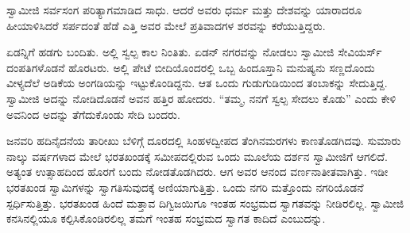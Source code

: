  ಸ್ವಾಮೀಜಿ ಸರ್ವಸಂಗ ಪರಿತ್ಯಾಗಮಾಡಿದ ಸಾಧು. ಆದರೆ ಅವರು ಧರ್ಮ ಮತ್ತು ದೇಶವನ್ನು ಯಾರಾದರೂ ಹೀಯಾಳಿಸಿದರೆ ಸರ್ಪದಂತೆ ಹೆಡೆ ಎತ್ತಿ ಅವರ ಮೇಲೆ ಪ್ರತಿವಾದಗಳ ಶರವನ್ನು ಕರೆಯುತ್ತಿದ್ದರು. 

 ಏಡನ್ನಿಗೆ ಹಡಗು ಬಂದಿತು. ಅಲ್ಲಿ ಸ್ವಲ್ಪ ಕಾಲ ನಿಂತಿತು. ಏಡನ್ ನಗರವನ್ನು ನೋಡಲು ಸ್ವಾಮೀಜಿ ಸೇವಿಯರ್ಸ್ ದಂಪತಿಗಳೊಡನೆ ಹೊರಟರು. ಅಲ್ಲಿ ಪೇಟೆ ಬೀದಿಯೊಂದರಲ್ಲಿ ಒಬ್ಬ ಹಿಂದೂಸ್ತಾನಿ ಮನುಷ್ಯನು ಸಣ್ಣದೊಂದು ವೀಳ್ಯದೆಲೆ ಅಡಿಕೆಯ ಅಂಗಡಿಯನ್ನು ಇಟ್ಟುಕೊಂಡಿದ್ದನು. ಆತ ಒಂದು ಗುಡುಗುಡಿಯಿಂದ ತಂಬಾಕನ್ನು ಸೇದುತ್ತಿದ್ದ. ಸ್ವಾಮೀಜಿ ಅದನ್ನು ನೋಡಿದೊಡನೆ ಅವನ ಹತ್ತಿರ ಹೋದರು. “ತಮ್ಮ, ನನಗೆ ಸ್ವಲ್ಪ ಸೇದಲು ಕೊಡು” ಎಂದು ಕೇಳಿ ಅವನಿಂದ ಅದನ್ನು ತೆಗೆದುಕೊಂಡು ಸೇದಿ ಬಂದರು. 

 ಜನವರಿ ಹದಿನೈದನೆಯ ತಾರೀಖು ಬೆಳಿಗ್ಗೆ ದೂರದಲ್ಲಿ ಸಿಂಹಳದ್ವೀಪದ ತೆಂಗಿನಮರಗಳು ಕಾಣತೊಡಗಿದವು. ಸುಮಾರು ನಾಲ್ಕು ವರ್ಷಗಳಾದ ಮೇಲೆ ಭರತಖಂಡಕ್ಕೆ ಸಮೀಪದಲ್ಲಿರುವ ಒಂದು ಮೂಲೆಯ ದರ್ಶನ ಸ್ವಾಮೀಜಿಗೆ ಆಗಲಿದೆ. ಅತ್ಯಂತ ಉತ್ಸಾಹದಿಂದ ಹೊರಗೆ ಬಂದು ನೋಡತೊಡಗಿದರು. ಆಗ ಅವರ ಆನಂದ ವರ್ಣನಾತೀತವಾಗಿತ್ತು. ಇಡೀ ಭರತಖಂಡ ಸ್ವಾಮಿಗಳನ್ನು ಸ್ವಾಗತಿಸುವುದಕ್ಕೆ ಅಣಿಯಾಗುತ್ತಿತ್ತು. ಒಂದು ನಗರಿ ಮತ್ತೊಂದು ನಗರಿಯೊಡನೆ ಸ್ಪರ್ಧಿಸುತ್ತಿತ್ತು. ಭರತಖಂಡ ಹಿಂದೆ ಮತ್ತಾವ ದಿಗ್ವಿಜಯಿಗೂ ಇಂತಹ ಸಂಭ್ರಮದ ಸ್ವಾಗತವನ್ನು ನೀಡಿರಲಿಲ್ಲ. ಸ್ವಾಮೀಜಿ ಕನಸಿನಲ್ಲಿಯೂ ಕಲ್ಪಿಸಿಕೊಂಡಿರಲಿಲ್ಲ ತಮಗೆ ಇಂತಹ ಸಂಭ್ರಮದ ಸ್ವಾಗತ ಕಾದಿದೆ ಎಂಬುದನ್ನು. 


